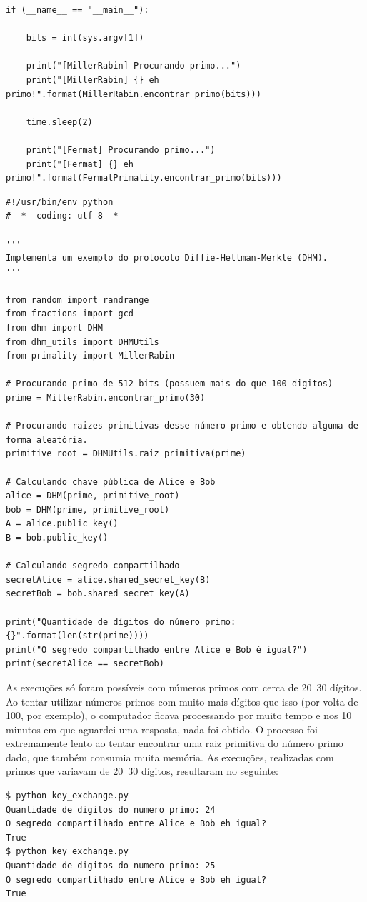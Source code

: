\documentclass[a4paper,11pt]{article}
\theoremstyle{mytheor}
\begin{document}
\begin{lstlisting}[caption=Arquivo primality.py.]
if (__name__ == "__main__"):

    bits = int(sys.argv[1])

    print("[MillerRabin] Procurando primo...")
    print("[MillerRabin] {} eh primo!".format(MillerRabin.encontrar_primo(bits)))

    time.sleep(2)
    
    print("[Fermat] Procurando primo...")
    print("[Fermat] {} eh primo!".format(FermatPrimality.encontrar_primo(bits)))
\end{lstlisting}

\begin{lstlisting}[caption=Arquivo key_exchange.py.]
#!/usr/bin/env python
# -*- coding: utf-8 -*-

'''
Implementa um exemplo do protocolo Diffie-Hellman-Merkle (DHM).
'''

from random import randrange
from fractions import gcd
from dhm import DHM
from dhm_utils import DHMUtils
from primality import MillerRabin

# Procurando primo de 512 bits (possuem mais do que 100 digitos)
prime = MillerRabin.encontrar_primo(30)

# Procurando raizes primitivas desse número primo e obtendo alguma de forma aleatória.
primitive_root = DHMUtils.raiz_primitiva(prime)

# Calculando chave pública de Alice e Bob
alice = DHM(prime, primitive_root)
bob = DHM(prime, primitive_root)
A = alice.public_key()
B = bob.public_key()

# Calculando segredo compartilhado
secretAlice = alice.shared_secret_key(B)
secretBob = bob.shared_secret_key(A)

print("Quantidade de dígitos do número primo: {}".format(len(str(prime))))
print("O segredo compartilhado entre Alice e Bob é igual?")
print(secretAlice == secretBob)
\end{lstlisting}

\noindent As execuções só foram possíveis com números primos com cerca de 20~30 dígitos. Ao tentar utilizar números primos com muito mais dígitos que isso (por volta de 100, por exemplo), o computador ficava processando por muito tempo e nos 10 minutos em que aguardei uma resposta, nada foi obtido. O processo foi extremamente lento ao tentar encontrar uma raiz primitiva do número primo dado, que também consumia muita memória. As execuções, realizadas com primos que variavam de 20~30 dígitos, resultaram no seguinte:

\begin{lstlisting}
$ python key_exchange.py 
Quantidade de digitos do numero primo: 24
O segredo compartilhado entre Alice e Bob eh igual?
True
$ python key_exchange.py 
Quantidade de digitos do numero primo: 25
O segredo compartilhado entre Alice e Bob eh igual?
True
\end{lstlisting}
\end{document}
